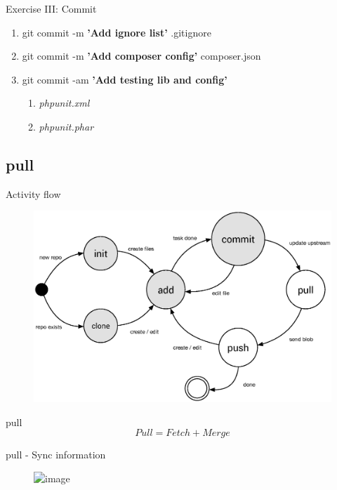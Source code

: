 \documentclass{beamer}
\begin{document}
\begin{frame}{Exercise III: Commit}
    \begin{enumerate}[\$]
        \item<1-> git commit -m \textbf{'Add ignore list'} .gitignore 
        \item<1-> git commit -m \textbf{'Add composer config'} composer.json
        \item<2-> git commit -am \textbf{'Add testing lib and config'}
            \begin{enumerate}[-]
                \item<3-> \em{phpunit.xml}
                \item<3-> \em{phpunit.phar}
            \end{enumerate}
    \end{enumerate}
\end{frame}

\subsection[pull]{pull}
\begin{frame}{Activity flow}
    \begin{figure}
        \center
        \includegraphics[width=.9\textwidth]{git-command-flow-3}
        \label{fig:git-command-flow-3}
    \end{figure}
\end{frame}

\begin{frame}{pull}
    \Large{
        \[
            Pull = Fetch + Merge
        \]
    }
\end{frame}

\begin{frame}{pull - Sync information}
    \begin{figure}
        \center
        \includegraphics<1>[width=.7\textwidth]{git-pulling-information}
        \label{fig:git-pulling-information}
    \end{figure}
\end{frame}
\end{document}
